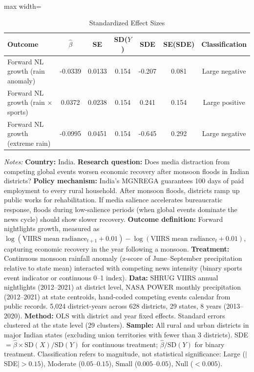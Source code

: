 \begin{table}[htbp]
\centering
\caption{Standardized Effect Sizes}
\label{tab:sde}
\begin{adjustbox}{max width=\textwidth}
\begin{tabular}{lcccccc}
\hline\hline
Outcome & $\hat{\beta}$ & SE & SD($Y$) & SDE & SE(SDE) & Classification \\
\hline
Forward NL growth (rain anomaly) & -0.0339 & 0.0133 & 0.154 & -0.207 & 0.081 & Large negative \\
Forward NL growth (rain $\times$ sports) & 0.0372 & 0.0238 & 0.154 & 0.241 & 0.154 & Large positive \\
Forward NL growth (extreme rain) & -0.0995 & 0.0451 & 0.154 & -0.645 & 0.292 & Large negative \\
\hline\hline
\end{tabular}
\end{adjustbox}
\begin{tablenotes}[flushleft]\small
\item \textit{Notes:} \textbf{Country:} India. \textbf{Research question:} Does media distraction from competing global events worsen economic recovery after monsoon floods in Indian districts? \textbf{Policy mechanism:} India's MGNREGA guarantees 100 days of paid employment to every rural household. After monsoon floods, districts ramp up public works for rehabilitation. If media salience accelerates bureaucratic response, floods during low-salience periods (when global events dominate the news cycle) should show slower recovery. \textbf{Outcome definition:} Forward nightlights growth, measured as $\log(\text{VIIRS mean radiance}_{t+1} + 0.01) - \log(\text{VIIRS mean radiance}_t + 0.01)$, capturing economic recovery in the year following a monsoon. \textbf{Treatment:} Continuous monsoon rainfall anomaly (z-score of June--September precipitation relative to state mean) interacted with competing news intensity (binary sports event indicator or continuous 0--1 index). \textbf{Data:} SHRUG VIIRS annual nightlights (2012--2021) at district level, NASA POWER monthly precipitation (2012--2021) at state centroids, hand-coded competing events calendar from public records. 5,024 district-years across 628 districts, 29 states, 8 years (2013--2020). \textbf{Method:} OLS with district and year fixed effects. Standard errors clustered at the state level (29 clusters). \textbf{Sample:} All rural and urban districts in major Indian states (excluding union territories with fewer than 3 districts). SDE $= \hat{\beta} \times \text{SD}(X) / \text{SD}(Y)$ for continuous treatment; $\hat{\beta} / \text{SD}(Y)$ for binary treatment. Classification refers to magnitude, not statistical significance: Large ($|$SDE$| > 0.15$), Moderate ($0.05$--$0.15$), Small ($0.005$--$0.05$), Null ($< 0.005$).
\end{tablenotes}
\end{table}

